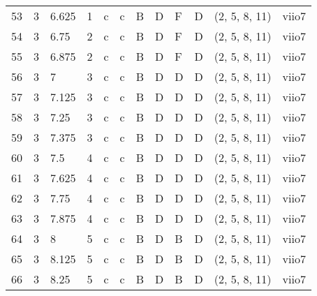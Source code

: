 \begin{tabular}{llllllllllll}
53  & 3       & 6.625  & 1               & c          & c              & B      & D       & F      & D         & (2, 5, 8, 11)    & viio7          \\
54  & 3       & 6.75   & 2               & c          & c              & B      & D       & F      & D         & (2, 5, 8, 11)    & viio7          \\
55  & 3       & 6.875  & 2               & c          & c              & B      & D       & F      & D         & (2, 5, 8, 11)    & viio7          \\
56  & 3       & 7      & 3               & c          & c              & B      & D       & D      & D         & (2, 5, 8, 11)    & viio7          \\
57  & 3       & 7.125  & 3               & c          & c              & B      & D       & D      & D         & (2, 5, 8, 11)    & viio7          \\
58  & 3       & 7.25   & 3               & c          & c              & B      & D       & D      & D         & (2, 5, 8, 11)    & viio7          \\
59  & 3       & 7.375  & 3               & c          & c              & B      & D       & D      & D         & (2, 5, 8, 11)    & viio7          \\
60  & 3       & 7.5    & 4               & c          & c              & B      & D       & D      & D         & (2, 5, 8, 11)    & viio7          \\
61  & 3       & 7.625  & 4               & c          & c              & B      & D       & D      & D         & (2, 5, 8, 11)    & viio7          \\
62  & 3       & 7.75   & 4               & c          & c              & B      & D       & D      & D         & (2, 5, 8, 11)    & viio7          \\
63  & 3       & 7.875  & 4               & c          & c              & B      & D       & D      & D         & (2, 5, 8, 11)    & viio7          \\
64  & 3       & 8      & 5               & c          & c              & B      & D       & B      & D         & (2, 5, 8, 11)    & viio7          \\
65  & 3       & 8.125  & 5               & c          & c              & B      & D       & B      & D         & (2, 5, 8, 11)    & viio7          \\
66  & 3       & 8.25   & 5               & c          & c              & B      & D       & B      & D         & (2, 5, 8, 11)    & viio7          \\

\end{tabular}
